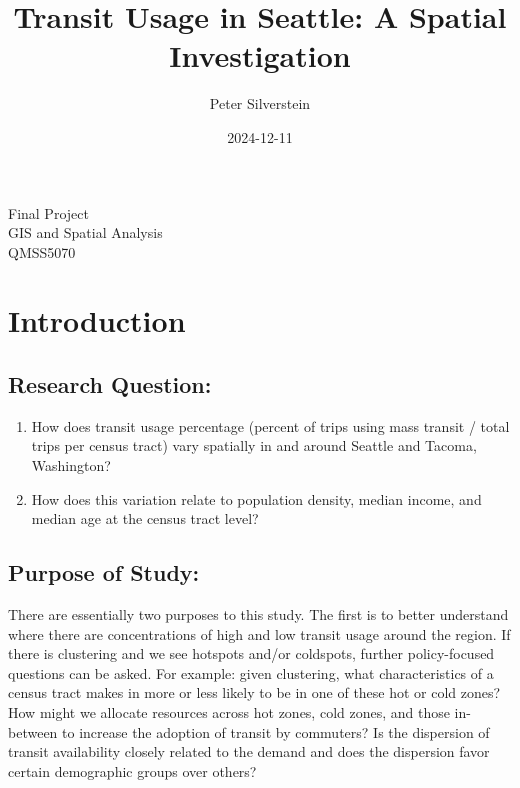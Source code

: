 \documentclass[
]{article}
\title{Transit Usage in Seattle: A Spatial Investigation}
\author{Peter Silverstein}
\date{2024-12-11}
\providecommand{\tightlist}{%
  \setlength{\itemsep}{0pt}\setlength{\parskip}{0pt}}
\begin{document}
\maketitle

\begin{center}
    {\large Final Project}\\[0.5cm]
    {\large GIS and Spatial Analysis}\\[0.5cm]
    {\large QMSS5070}\\[0.5cm]
\end{center}

\newpage

\tableofcontents

\newpage

\section{Introduction}\label{introduction}

\subsection{Research Question:}\label{research-question}

\begin{enumerate}
\def\labelenumi{\arabic{enumi}.}
\tightlist
\item
  How does transit usage percentage (percent of trips using mass transit
  / total trips per census tract) vary spatially in and around Seattle
  and Tacoma, Washington?
\item
  How does this variation relate to population density, median income,
  and median age at the census tract level?
\end{enumerate}

\subsection{Purpose of Study:}\label{purpose-of-study}

There are essentially two purposes to this study. The first is to better
understand where there are concentrations of high and low transit usage
around the region. If there is clustering and we see hotspots and/or
coldspots, further policy-focused questions can be asked. For example:
given clustering, what characteristics of a census tract makes in more
or less likely to be in one of these hot or cold zones? How might we
allocate resources across hot zones, cold zones, and those in-between to
increase the adoption of transit by commuters? Is the dispersion of
transit availability closely related to the demand and does the
dispersion favor certain demographic groups over others?
\end{document}
